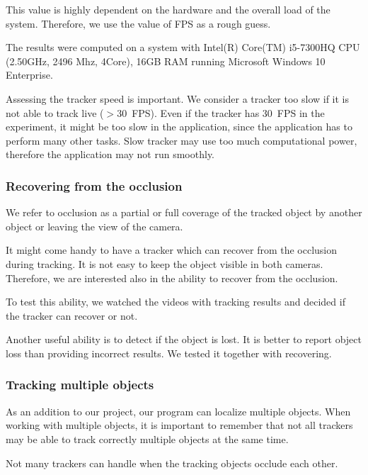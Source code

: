This value is highly dependent on the hardware and the overall load of the
system.  Therefore, we use the value of FPS as a rough guess.

The results were computed on a system with Intel(R) Core(TM) i5-7300HQ CPU
(2.50GHz, 2496 Mhz, 4Core), 16GB RAM running Microsoft Windows 10 Enterprise.


Assessing the tracker speed is important. We consider a tracker too slow if
it is not able to track live ($>$30~FPS). Even if the tracker has 30~FPS in the
experiment, it might be too slow in the application, since the application has
to perform many other tasks. Slow tracker may use too much computational power,
therefore the application may not run smoothly.

\subsubsection*{Recovering from the occlusion}

We refer to occlusion as a partial or full coverage of the tracked object by
another object or leaving the view of the camera.

It might come handy to have a tracker which can recover
from the occlusion during tracking. It is not easy to keep the object visible in both cameras.
Therefore, we are interested also in the ability to recover from the occlusion.

To test this ability, we watched the videos with tracking results and decided
if the tracker can recover or not.

Another useful ability is to detect if the object is lost. It is better to
report object loss than providing incorrect results. We tested it together with
recovering.

\subsubsection*{Tracking multiple objects}

As an addition to our project, our program can localize multiple objects. When
working with multiple objects, it is important to remember that not all
trackers may be able to track correctly multiple objects at the same time.

Not many trackers can handle when the tracking objects occlude each other.

